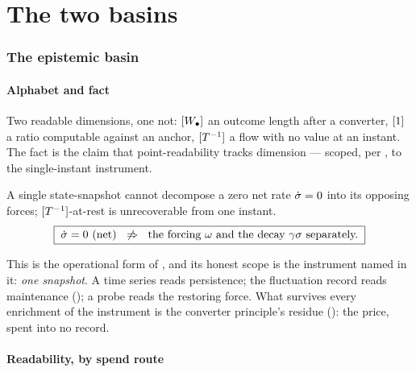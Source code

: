 \documentclass[../main]{subfiles}
\begin{document}
\clearpage
\part{The two basins}

\section{The epistemic basin}
\label{sec:epistemic}

\subsection{Alphabet and fact}
\label{subsec:epi:fact}
%
Two readable dimensions, one not: $[W\sb{\bullet}]$ an outcome length after a converter,
$[1]$ a ratio computable against an anchor, $[T\sp{-1}]$ a flow with no value at an
instant. The fact is the claim that point-readability tracks dimension --- scoped, per
, to the single-instant instrument.

\begin{postulate}
  A single state-snapshot cannot decompose a zero net rate $\dot{\sigma}=0$ into its opposing
  forces; $[T\sp{-1}]$-at-rest is unrecoverable from one instant.
  \begin{equation}
    \boxed{\;\alignrate=0\ \text{(net)}\ \;\not\Rightarrow\;\
    \text{the forcing }\will\ \text{and the decay }\willdecay\ \text{separately.}\;}
    \label{eq:epi:decompose}
  \end{equation}
\end{postulate}

This is the operational form of , and its honest scope is the instrument
named in it: \emph{one snapshot}. A time series reads persistence; the fluctuation record
reads maintenance (\ftag{J:tremble}); a probe reads the restoring force. What survives
every enrichment of the instrument is the converter principle's residue
(\ftag{epi:conv}): the price, spent into no record.

\subsection{Readability, by spend route}
\label{subsec:epi:readability}
%
\end{document}
